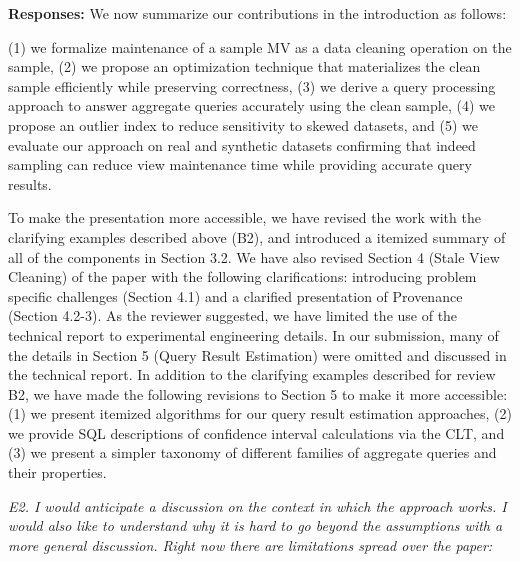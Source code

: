 {\bf Responses:} We now summarize our contributions in the introduction as follows:
\begin{displayquote}
(1) we formalize maintenance of a sample MV as a data cleaning operation on the sample, (2) we propose an optimization technique that materializes the clean sample efficiently while preserving correctness, (3) we derive a query processing approach to answer aggregate queries accurately using the clean sample, (4) we propose an outlier index to reduce sensitivity to skewed datasets, and (5) we evaluate our approach on real and synthetic datasets confirming that indeed sampling can reduce view maintenance time while providing accurate query results. 
\end{displayquote}
To make the presentation more accessible, we have revised the work with the clarifying examples described above (B2), and introduced a itemized summary of all of the components in Section 3.2. We have also revised Section 4 (Stale View Cleaning) of the paper with the following clarifications: introducing problem specific challenges (Section 4.1) and a clarified presentation of Provenance (Section 4.2-3). As the reviewer suggested, we have limited the use of the technical report to experimental engineering details. In our submission, many of the details in Section 5 (Query Result Estimation) were omitted and discussed in the technical report. In addition to the clarifying examples described for review B2, we have made the following revisions to Section 5 to make it more accessible: (1) we present itemized algorithms for our query result estimation approaches, (2) we provide SQL descriptions of confidence interval calculations via the CLT, and (3) we present a simpler taxonomy of different families of aggregate queries and their properties.

\vspace{1em}
\emph{E2. I would anticipate a discussion on the context in which the approach works. I would also like to understand why it is hard to go beyond the assumptions with a more general discussion. Right now there are limitations spread over the paper: }

\vspace{.25em}

